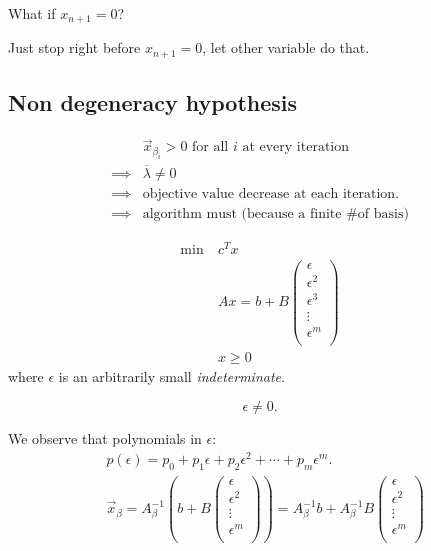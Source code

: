 \begin{problem}
What if \(x_{n+1} = 0\)?
\end{problem}
\begin{intuition}
	Just stop right before \(x_{n+1} = 0\), let other variable do that.
\end{intuition}

\subsection{Non degeneracy hypothesis}
\[
	\begin{split}
		&\vec{x}_{\beta_i} > 0 \text{ for all \(i\) at every iteration}\\
		\implies &\overline{\lambda} \neq 0\\
		\implies &\text{objective value decrease at each iteration.}\\
		\implies &\text{algorithm must (because a finite \# of basis)}
	\end{split}
\]

\begin{align*}
	\min~ & c^T x                    \\
	      & Ax = b + B\begin{pmatrix}
		                  \epsilon   \\
		                  \epsilon^2 \\
		                  \epsilon^3 \\
		                  \vdots     \\
		                  \epsilon^m \\
	                  \end{pmatrix} \\
	      & x\geq 0
\end{align*}
where \(\epsilon \) is an arbitrarily small \emph{indeterminate}.
\begin{remark}
	\[
		\epsilon \neq 0.
	\]
\end{remark}

We observe that polynomials in \(\epsilon \):
\[
	\begin{split}
		&p(\epsilon) = p_0 + p_1\epsilon + p_2 \epsilon^2 + \cdots + p_{m}\epsilon^m.	\\
		&\vec{x}_{\beta} = A^{-1}_{\beta}\left(b + B\begin{pmatrix}
				\epsilon   \\
				\epsilon^2 \\
				\vdots     \\
				\epsilon^m \\
			\end{pmatrix}\right) = A^{-1}_{\beta}b + A^{-1}_{\beta}B\begin{pmatrix}
			\epsilon   \\
			\epsilon^2 \\
			\vdots     \\
			\epsilon^m \\
		\end{pmatrix}
	\end{split}
\]


